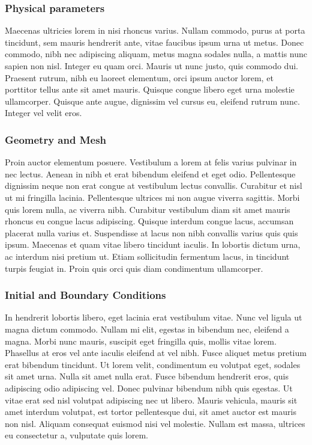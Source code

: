 \subsubsection{Physical parameters}
%
Maecenas ultricies lorem in nisi rhoncus varius. Nullam commodo, purus at
porta tincidunt, sem mauris hendrerit ante, vitae faucibus ipsum urna ut
metus. Donec commodo, nibh nec adipiscing aliquam, metus magna sodales nulla,
a mattis nunc sapien non nisl. Integer eu quam orci. Mauris ut nunc justo,
quis commodo dui. Praesent rutrum, nibh eu laoreet elementum, orci ipsum
auctor lorem, et porttitor tellus ante sit amet mauris. Quisque congue libero
eget urna molestie ullamcorper. Quisque ante augue, dignissim vel cursus eu,
eleifend rutrum nunc. Integer vel velit eros.
%
%
\subsubsection{Geometry and Mesh}
%
Proin auctor elementum posuere. Vestibulum a lorem at felis varius pulvinar in
nec lectus. Aenean in nibh et erat bibendum eleifend et eget odio.
Pellentesque dignissim neque non erat congue at vestibulum lectus convallis.
Curabitur et nisl ut mi fringilla lacinia. Pellentesque ultrices mi non augue
viverra sagittis. Morbi quis lorem nulla, ac viverra nibh. Curabitur
vestibulum diam sit amet mauris rhoncus eu congue lacus adipiscing. Quisque
interdum congue lacus, accumsan placerat nulla varius et. Suspendisse at lacus
non nibh convallis varius quis quis ipsum. Maecenas et quam vitae libero
tincidunt iaculis. In lobortis dictum urna, ac interdum nisi pretium ut. Etiam
sollicitudin fermentum lacus, in tincidunt turpis feugiat in. Proin quis orci
quis diam condimentum ullamcorper.
%
%
\subsubsection{Initial and Boundary Conditions}
%
In hendrerit lobortis libero, eget lacinia erat vestibulum vitae. Nunc vel
ligula ut magna dictum commodo. Nullam mi elit, egestas in bibendum nec,
eleifend a magna. Morbi nunc mauris, suscipit eget fringilla quis, mollis
vitae lorem. Phasellus at eros vel ante iaculis eleifend at vel nibh. Fusce
aliquet metus pretium erat bibendum tincidunt. Ut lorem velit, condimentum eu
volutpat eget, sodales sit amet urna. Nulla sit amet nulla erat. Fusce
bibendum hendrerit eros, quis adipiscing odio adipiscing vel. Donec pulvinar
bibendum nibh quis egestas. Ut vitae erat sed nisl volutpat adipiscing nec ut
libero. Mauris vehicula, mauris sit amet interdum volutpat, est tortor
pellentesque dui, sit amet auctor est mauris non nisl. Aliquam consequat
euismod nisi vel molestie. Nullam est massa, ultrices eu consectetur a,
vulputate quis lorem.
%
%

